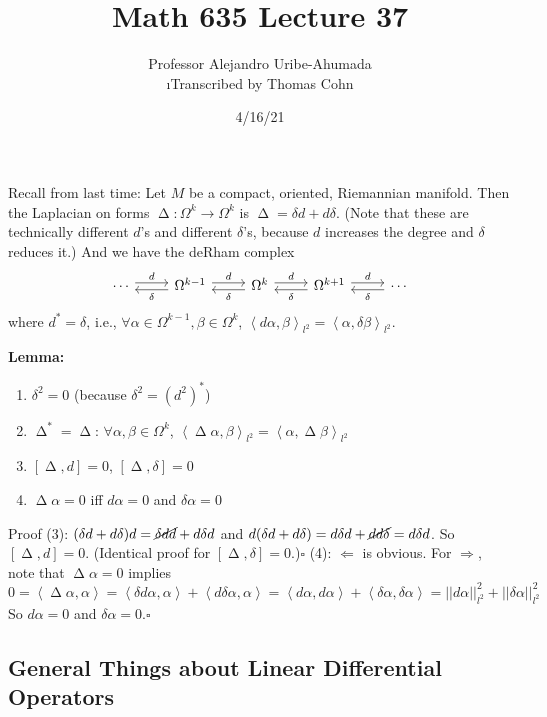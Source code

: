 \documentclass[10pt,letterpaper]{article}
\author{Professor Alejandro Uribe-Ahumada\\ \small\i{Transcribed by Thomas Cohn}}
\title{Math 635 Lecture 37}
\date{4/16/21} %
\newcommand{\n}{\hfill\break}
\newcommand{\nn}{\vspace{0.5\baselineskip}\n}
\newcommand{\up}{\vspace{-\baselineskip}}
\newcommand{\hangblock}[2]{\par\noindent\settowidth{\hangindent}{\textbf{#1: }}\textbf{#1: }\nolinebreak#2}
\newcommand{\lemma}[1]{\hangblock{Lemma}{#1}}
\newcommand{\proven}{\;$\square$\n}
\newcommand{\comm}[1]{\left[#1\right]}
\DeclareMathOperator{\Laplacian}{\Delta}
\newcommand{\abs}[1]{\left|#1\right|}
\newcommand{\norm}[1]{\abs{\abs{#1}}}
\newcommand{\iprod}[1]{\left<#1\right>}
\begin{document}
\maketitle
\setlength\RaggedRightParindent{\parindent}
\RaggedRight

\par\noindent
Recall from last time: Let $M$ be a compact, oriented, Riemannian manifold. Then the Laplacian on forms $\Laplacian:\Omega^{k}\to\Omega^{k}$ is $\Laplacian=\delta{}d+d\delta$. (Note that these are technically different $d$'s and different $\delta$'s, because $d$ increases the degree and $\delta$ reduces it.) And we have the deRham complex
\[
	\begin{tikzcd}
		\cdots \arrow[r, shift left, "d"] & \Omega^{k-1} \arrow[l, shift left, "\delta"] \arrow[r, shift left, "d"] & \Omega^{k} \arrow[l, shift left, "\delta"] \arrow[r, shift left, "d"] & \Omega^{k+1} \arrow[l, shift left, "\delta"] \arrow[r, shift left, "d"] & \cdots \arrow[l, shift left, "\delta"]
	\end{tikzcd}
\]
where $d^{*}=\delta$, i.e., $\forall\alpha\in\Omega^{k-1},\beta\in\Omega^{k}$, $\iprod{d\alpha,\beta}_{l^{2}}=\iprod{\alpha,\delta\beta}_{l^{2}}$.\n

\lemma{
	\begin{enumerate}[leftmargin=4\parindent, label=(\arabic*)]
		\item $\delta^{2}=0$ (because $\delta^{2}=(d^{2})^{*}$)
		\item $\Laplacian^{*}=\Laplacian$: $\forall\alpha,\beta\in\Omega^{k}$, $\iprod{\Laplacian\alpha,\beta}_{l^{2}}=\iprod{\alpha,\Laplacian\beta}_{l^{2}}$
		\item $\comm{\Laplacian,d}=0$, $\comm{\Laplacian,\delta}=0$
		\item $\Laplacian\alpha=0$ iff $d\alpha=0$ and $\delta\alpha=0$
	\end{enumerate}\up\nn
	Proof (3): $(\delta{}d+d\delta)d=\cancel{\delta{}dd}+d\delta{}d$ and $d(\delta{}d+d\delta)=d\delta{}d+\cancel{dd\delta}=d\delta{}d$. So $\comm{\Laplacian,d}=0$. (Identical proof for $\comm{\Laplacian,\delta}=0$.)\proven
	(4): $\Leftarrow$ is obvious. For $\Rightarrow$, note that $\Laplacian\alpha=0$ implies
	\[
		0=\iprod{\Laplacian\alpha,\alpha}=\iprod{\delta{}d\alpha,\alpha}+\iprod{d\delta\alpha,\alpha}=\iprod{d\alpha,d\alpha}+\iprod{\delta\alpha,\delta\alpha}=\norm{d\alpha}_{l^{2}}^{2}+\norm{\delta\alpha}_{l^{2}}^{2}
	\]
	So $d\alpha=0$ and $\delta\alpha=0$.\proven
}

\subsection*{General Things about Linear Differential Operators}
\end{document}
